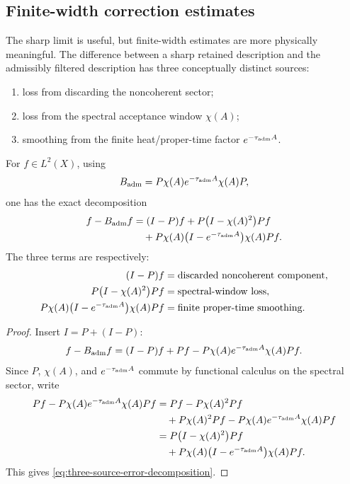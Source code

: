 \documentclass[11pt]{article}
\begin{document}
\subsection{Finite-width correction estimates}
\label{subsec:finite-width-estimates}

The sharp limit is useful, but finite-width estimates are more physically meaningful. The
difference between a sharp retained description and the admissibly filtered description has
three conceptually distinct sources:
\begin{enumerate}[label=(\roman*)]
  \item loss from discarding the noncoherent sector;
  \item loss from the spectral acceptance window \(\chi(A)\);
  \item smoothing from the finite heat/proper-time factor \(e^{-\tau_{\rm adm}A}\).
\end{enumerate}

For \(f\in L^2(X)\), using
\begin{equation}
  B_{\rm adm}=P\chi(A)e^{-\tau_{\rm adm}A}\chi(A)P,
\end{equation}
one has the exact decomposition
\begin{align}
  f-B_{\rm adm}f
  &=
  (I-P)f
  +
  P\bigl(I-\chi(A)^2\bigr)Pf
  \nonumber\\
  &\quad+
  P\chi(A)\bigl(I-e^{-\tau_{\rm adm}A}\bigr)\chi(A)Pf.
  \label{eq:three-source-error-decomposition}
\end{align}
The three terms are respectively:
\begin{align}
  (I-P)f
  &=
  \text{discarded noncoherent component},
  \\
  P\bigl(I-\chi(A)^2\bigr)Pf
  &=
  \text{spectral-window loss},
  \\
  P\chi(A)\bigl(I-e^{-\tau_{\rm adm}A}\bigr)\chi(A)Pf
  &=
  \text{finite proper-time smoothing}.
\end{align}

\begin{proof}
Insert \(I=P+(I-P)\):
\begin{equation}
  f-B_{\rm adm}f
  =
  (I-P)f
  +
  P f
  -
  P\chi(A)e^{-\tau_{\rm adm}A}\chi(A)P f.
\end{equation}
Since \(P\), \(\chi(A)\), and \(e^{-\tau_{\rm adm}A}\) commute by functional calculus on the
spectral sector, write
\begin{align}
  P f
  -
  P\chi(A)e^{-\tau_{\rm adm}A}\chi(A)P f
  &=
  P f
  -
  P\chi(A)^2P f
  \nonumber\\
  &\quad+
  P\chi(A)^2P f
  -
  P\chi(A)e^{-\tau_{\rm adm}A}\chi(A)P f
  \\
  &=
  P\bigl(I-\chi(A)^2\bigr)P f
  \nonumber\\
  &\quad+
  P\chi(A)\bigl(I-e^{-\tau_{\rm adm}A}\bigr)\chi(A)P f.
\end{align}
This gives \eqref{eq:three-source-error-decomposition}.
\end{proof}
\end{document}
